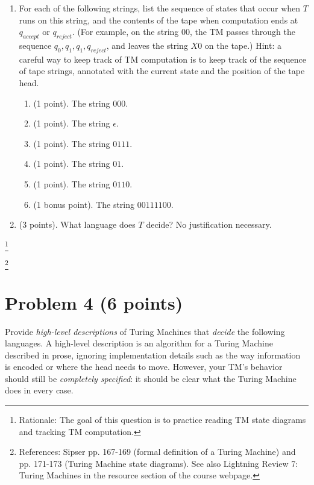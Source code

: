 \documentclass[letterpaper,11pt,twoside]{article}
\theoremstyle{plain}
\theoremstyle{definition}
\theoremstyle{remark}
\theoremstyle{restate}
\newcommand\blfootnote[1]{%
  \begingroup
  \renewcommand\thefootnote{}\footnote{#1}%
  \addtocounter{footnote}{-1}%
  \endgroup
}
\begin{document}
    \begin{enumerate}
    \item For each of the following strings, list the sequence of states that occur when $T$ runs on this string, and the contents of the tape when computation ends at $q_{accept}$ or $q_{reject}$. (For example, on the string $00$, the TM passes through the sequence $q_0, q_1, q_1, q_{reject}$, and leaves the string $X0$ on the tape.) Hint: a careful way to keep track of TM computation is to keep track of the sequence of tape strings, annotated with the current state and the position of the tape head.
    
    \begin{enumerate}
        \item (1 point). The string $000$.

        \item (1 point). The string $\epsilon$.

        \item (1 point). The string $0111$.

        \item (1 point). The string $01$.

        \item (1 point). The string $0110$.

        \item (1 bonus point). The string $00111100$.

    \end{enumerate}

    \item (3 points). What language does $T$ decide? No justification necessary.
    
    \end{enumerate}
    
    \blfootnote{ Rationale: The goal of this question is to practice reading TM state diagrams and tracking TM computation. }
    \blfootnote{ References: Sipser pp. 167-169 (formal definition of a Turing Machine) and pp. 171-173 (Turing Machine state diagrams). See also Lightning Review 7: Turing Machines in the resource section of the course webpage. }
    
\clearpage
\section*{Problem 4 (6 points)}
Provide \emph{high-level descriptions} of Turing Machines that \emph{decide} the following languages. A high-level description is an algorithm for a Turing Machine described in prose, ignoring implementation details such as the way information is encoded or where the head needs to move. However, your TM's behavior should still be \emph{completely specified}: it should be clear what the Turing Machine does in every case.
\end{document}
